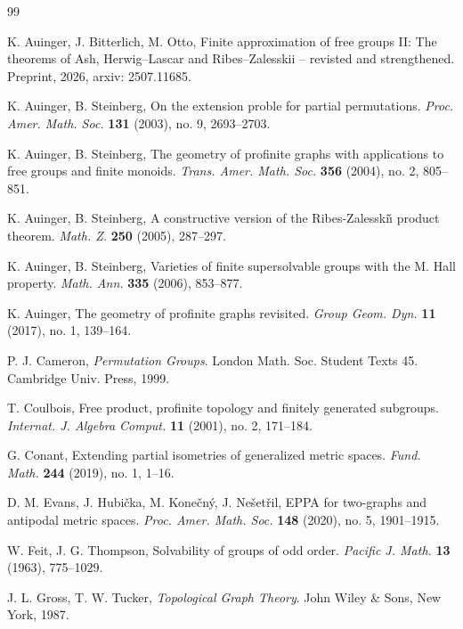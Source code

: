 \documentclass[11pt]{amsart}
\theoremstyle{definition}
\theoremstyle{definition}
\numberwithin{equation}{section}
\begin{document}
\begin{thebibliography}{99}

\addtolength{\leftmargin}{0.2in} %
\setlength{\itemindent}{-0.2in} 

K. Auinger, J. Bitterlich, M. Otto,
Finite approximation of free groups II: The theorems of Ash, Herwig--Lascar and Ribes--Zalesskii -- revisted and strengthened.
Preprint, 2026, arxiv: 2507.11685.

K. Auinger, B. Steinberg,
On the extension proble for partial permutations.
\textit{Proc. Amer. Math. Soc.} {\bf 131} (2003), no. 9, 2693--2703.

K. Auinger, B. Steinberg,
The geometry of profinite graphs with applications to free groups and finite monoids.
\textit{Trans. Amer. Math. Soc.} {\bf 356} (2004), no. 2, 805--851.

K. Auinger, B. Steinberg, 
A constructive version of the Ribes-Zalesski\v{\i} product theorem.
\textit{Math. Z.} {\bf 250} (2005), 287--297.

K. Auinger, B. Steinberg,
Varieties of finite supersolvable groups with the M. Hall property.
\textit{Math. Ann.} {\bf 335} (2006), 853--877.

K. Auinger,
The geometry of profinite graphs revisited.
\textit{Group Geom. Dyn.} {\bf 11} (2017), no. 1, 139--164.

P. J. Cameron,
\textit{Permutation Groups}. London Math. Soc. Student Texts 45. Cambridge Univ. Press, 1999.

T. Coulbois,
Free product, profinite topology and finitely generated subgroups.
\textit{Internat. J. Algebra Comput.} {\bf 11} (2001), no. 2, 171--184.

G. Conant, 
Extending partial isometries of generalized metric spaces.
\textit{Fund. Math.} {\bf 244} (2019), no. 1, 1--16.

D. M. Evans, J. Hubi\v{c}ka, M. Kone\v{c}n\'{y}, J. Ne\v{s}et\v{r}il,
EPPA for two-graphs and antipodal metric spaces.
\textit{Proc. Amer. Math. Soc.} {\bf 148} (2020), no. 5, 1901--1915.

W. Feit, J. G. Thompson,
Solvability of groups of odd order.
\textit{Pacific J. Math.} {\bf 13} (1963), 775--1029.

J. L. Gross, T. W. Tucker,
\textit{Topological Graph Theory}. John Wiley \& Sons, New York, 1987.



\end{thebibliography}
\end{document}
